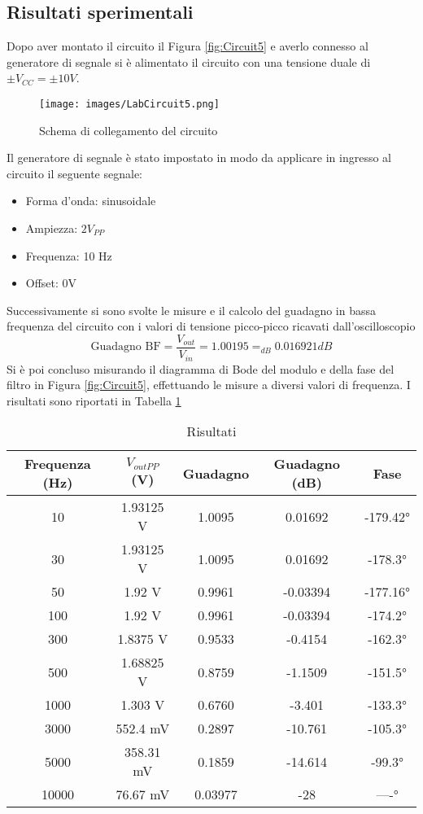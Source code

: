 \subsection{Risultati sperimentali}
Dopo aver montato il circuito il Figura \ref{fig:Circuit5} e averlo connesso al generatore di segnale si è alimentato il circuito con una tensione duale di $\pm V_{CC}=\pm10V$. 
\begin{figure}[H]
    \centering
    \texttt{[image: images/LabCircuit5.png]}
    \caption{Schema di collegamento del circuito}
    \label{fig:LabCircuit5}
\end{figure}
Il generatore di segnale è stato impostato in modo da applicare in ingresso al circuito il seguente segnale:
\begin{itemize}
    \item Forma d'onda: sinusoidale
    \item Ampiezza: $2V_{PP}$
    \item Frequenza: 10 Hz
    \item Offset: 0V
\end{itemize}
Successivamente si sono svolte le misure e il calcolo del guadagno in bassa frequenza del circuito con i valori di tensione picco-picco ricavati dall'oscilloscopio
\begin{equation}
    \text{Guadagno BF} = \frac{V_{out}}{V_{in}} = 1.00195 =_{dB} 0.016921 dB
\end{equation}
Si è poi concluso misurando il diagramma di Bode del modulo e della fase del filtro in Figura \ref{fig:Circuit5}, effettuando le misure a diversi valori di frequenza. I risultati sono riportati in Tabella \ref{tab:Ris5}
\begin{table}[H]
    \centering
    \begin{tabular}{||c|c|c|c|c||}
    \hline
       Frequenza (Hz)  & $V_{outPP}$ (V) & Guadagno & Guadagno (dB) & Fase  \\\hline\hline
       10 & 1.93125 V & 1.0095 & 0.01692 & -179.42° \\\hline
       30 & 1.93125 V & 1.0095 & 0.01692 & -178.3° \\\hline
       50 & 1.92 V & 0.9961 & -0.03394 & -177.16° \\\hline
       100 & 1.92 V & 0.9961 & -0.03394 & -174.2° \\\hline
       300 & 1.8375 V & 0.9533 & -0.4154 & -162.3° \\\hline
       500 & 1.68825 V & 0.8759 & -1.1509 & -151.5° \\\hline
       1000 &  1.303 V & 0.6760 & -3.401 & -133.3° \\\hline
       3000 & 552.4 mV & 0.2897 & -10.761 & -105.3° \\\hline
       5000 & 358.31 mV & 0.1859 & -14.614 & -99.3° \\\hline
       10000 & 76.67 mV & 0.03977 & -28 & ----° \\\hline
       
    \end{tabular}
    \caption{Risultati}
    \label{tab:Ris5}
\end{table}
